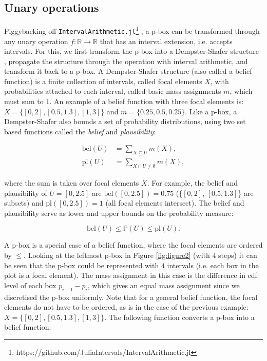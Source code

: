 \documentclass{juliacon}
\begin{document}
\subsection{Unary operations}
Piggybacking off \texttt{IntervalArithmetic.jl}\footnote{https://github.com/JuliaIntervals/IntervalArithmetic.jl} \cite{david_p_sanders_2021_5519761}, a p-box can be transformed through any unary operation $f: \mathbb{R} \rightarrow \mathbb{R}$ that has  an interval extension, i.e. accepts intervals. For this, we first transform the p-box into a Dempster-Shafer structure \cite{dempster2008upper,shafer1976mathematical}, propagate the structure through the operation with interval arithmetic, and transform it back to a p-box. A Dempster-Shafer structure (also called a belief function) is a finite collection of intervals, called focal elements $X$, with probabilities attached to each interval, called basic mass assignments $m$, which must sum to $1$. An example of a belief function with three focal elements is: $X = \{[0, 2], [0.5, 1.3], [1, 3]\}$ and $m = \{0.25, 0.5, 0.25\}$. Like a p-box, a Dempster-Shafer also bounds a set of probability distributions, using two set based functions called the \textit{belief} and \textit{plausibility}:

\begin{align*}
  \text{bel}(U) &= \sum_{X \subseteq U} m(X),\\ 
  \text{pl}(U) &= \sum_{X \cap U \neq \emptyset} m(X),
\end{align*}

where the sum is taken over focal elements $X$. For example, the belief and plausibility of $U = [0,2.5]$ are $\text{bel}([0,2.5]) = 0.75$ (\{$[0, 2]$, $[0.5, 1.3]$\} are subsets) and $\text{pl}([0, 2.5]) = 1$ (all focal elements intersect). The belief and plausibility serve as lower and upper bounds on the probability measure:

\begin{equation*}
  \text{bel}(U) \leq \mathbb{P}(U) \leq \text{pl}(U) .
\end{equation*}


A p-box is a special case of a belief function, where the focal elements are ordered by $\leq$. Looking at the leftmost p-box in Figure \ref{fig:figure2} (with $4$ steps) it can be seen that the p-box could be represented with $4$ intervals (i.e. each box in the plot is a focal element). The mass assignment
in this case is the difference in cdf level of each box $p_{i+1} - p_{i}$, which gives an equal mass assignment since we discretised the p-box uniformly. Note that for a general belief function, the focal elements do not have to be ordered, as is in the case of the previous example: $X = \{[0, 2], [0.5, 1.3], [1, 3]\}$. The following function converts a p-box into a belief function:
\end{document}
